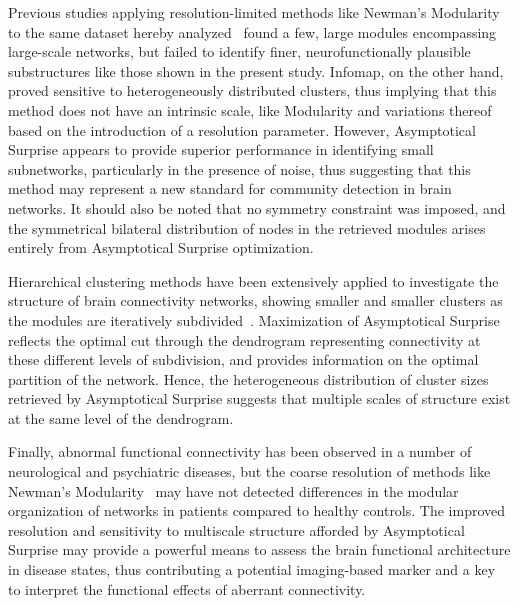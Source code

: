 Previous studies applying resolution-limited methods like Newman's Modularity to the same dataset hereby analyzed~\cite{crossley2013a} found a few, large modules encompassing large-scale networks, but failed to identify finer, neurofunctionally plausible substructures like those shown in the present study. Infomap, on the other hand, proved sensitive to heterogeneously distributed clusters, thus implying that this method does not have an intrinsic scale, like Modularity and variations thereof based on the introduction of a resolution parameter. 
However, Asymptotical Surprise appears to provide superior performance in identifying small subnetworks, particularly in the presence of noise, thus suggesting that this method may represent a new standard for community detection in brain networks. It should also be noted that no symmetry constraint was imposed, and the symmetrical bilateral distribution of nodes in the retrieved modules arises entirely from Asymptotical Surprise optimization. 

Hierarchical clustering methods have been extensively applied to investigate the structure of brain connectivity networks, showing smaller and smaller clusters as the modules are iteratively subdivided~\cite{meunier2010}. Maximization of Asymptotical Surprise reflects the optimal cut through the dendrogram representing connectivity at these different levels of subdivision, and provides information on the optimal partition of the network. Hence, the heterogeneous distribution of cluster sizes retrieved by Asymptotical Surprise suggests that multiple scales of structure exist at the same level of the dendrogram.

Finally, abnormal functional connectivity has been observed in a number of neurological and psychiatric diseases, but the coarse resolution of methods like Newman's Modularity~\cite{fornito2015} may have not detected differences in the modular organization of networks in patients compared to healthy controls. The improved resolution and sensitivity to multiscale structure afforded by Asymptotical Surprise may provide a powerful means to assess the brain functional architecture in disease states, thus contributing a potential imaging-based marker and a key to interpret the functional effects of aberrant connectivity.

